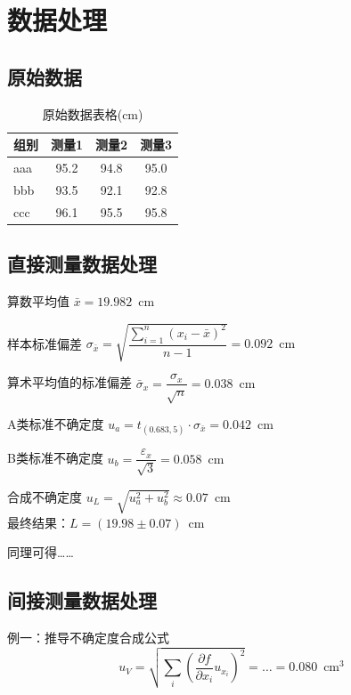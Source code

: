 \documentclass[11pt]{article}
\begin{document}
\section{数据处理}

\subsection{原始数据}

    \begin{table}[h]
  \centering
  \begin{tabular}{lccc} %
    \toprule
    组别 & 测量1  & 测量2  & 测量3  \\
    \midrule
    aaa & 95.2 & 94.8 & 95.0 \\
    bbb & 93.5 & 92.1 & 92.8 \\
    ccc & 96.1 & 95.5 & 95.8 \\
    \bottomrule
  \end{tabular}
  \caption{原始数据表格(cm)}
\end{table}

\subsection{直接测量数据处理}
算数平均值 $\bar{x} = 19.982 \enspace\text{cm}$

样本标准偏差 $\sigma_{\bar{x}} = \sqrt{\dfrac{\sum_{i=1}^{n}(x_i - \bar{x})^2}{n-1}} =0.092 \enspace\text{cm}$

算术平均值的标准偏差 $\bar{\sigma}_x = \dfrac{\sigma_x}{\sqrt{n}} = 0.038 \enspace\text{cm}$

A类标准不确定度 $u_a = t_{(0.683,5)} \cdot \sigma_{\bar{x}} = 0.042 \enspace\text{cm}$

B类标准不确定度 $u_b = \dfrac{\varepsilon_x}{\sqrt{3}} = 0.058 \enspace\text{cm}$

合成不确定度 $u_L = \sqrt{u_a^2+u_b^2} \approx 0.07 \enspace\text{cm}$\\

最终结果：$L=(19.98\pm 0.07) \enspace\text{cm}$

同理可得……

\subsection{间接测量数据处理}

   例一：推导不确定度合成公式
   $$ u_V = \sqrt{\sum_i \left( \frac{\partial f}{\partial x_i} u_{x_i} \right)^2 } =\dots=0.080 \enspace\text{cm}^3$$
   
\end{document}
